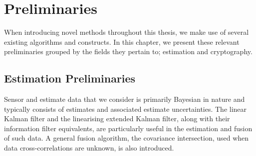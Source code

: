 
\chapter{Preliminaries}\label{ch:prelims}
When introducing novel methods throughout this thesis, we make use of several existing algorithms and constructs. In this chapter, we present these relevant preliminaries grouped by the fields they pertain to; estimation and cryptography.

% 
%                                                                                                      
%                                                                                                      
%                                                                                                      
% 

\section{Estimation Preliminaries}\label{sec:prelims:est_prelims}
Sensor and estimate data that we consider is primarily Bayesian in nature and typically consists of estimates and associated estimate uncertainties. The linear Kalman filter and the linearising extended Kalman filter, along with their information filter equivalents, are particularly useful in the estimation and fusion of such data. A general fusion algorithm, the covariance intersection, used when data cross-correlations are unknown, is also introduced.

% 
% 

